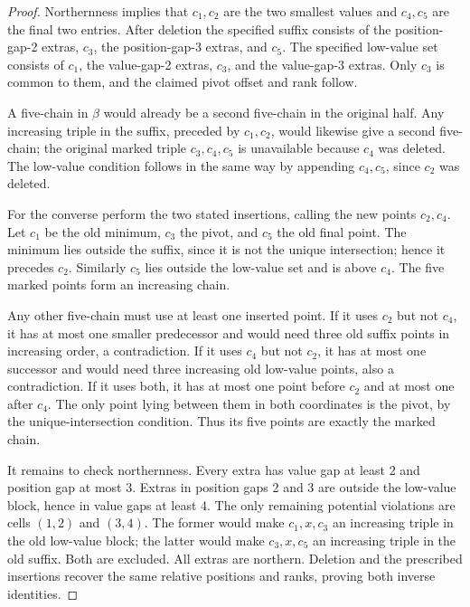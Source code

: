 \documentclass[11pt,letterpaper]{article}
\theoremstyle{remark}\newtheorem{remark}[theorem]{Remark}
\numberwithin{equation}{section}
\begin{document}
\begin{proof}
Northernness implies that $c_1,c_2$ are the two smallest values and
$c_4,c_5$ are the final two entries. After deletion the specified suffix
consists of the position-gap-2 extras, $c_3$, the position-gap-3 extras,
and $c_5$. The specified low-value set consists of $c_1$, the
value-gap-2 extras, $c_3$, and the value-gap-3 extras. Only $c_3$ is
common to them, and the claimed pivot offset and rank follow.

A five-chain in $\beta$ would already be a second five-chain in the
original half. Any increasing triple in the suffix, preceded by
$c_1,c_2$, would likewise give a second five-chain; the original marked
triple $c_3,c_4,c_5$ is unavailable because $c_4$ was deleted. The
low-value condition follows in the same way by appending $c_4,c_5$,
since $c_2$ was deleted.

For the converse perform the two stated insertions, calling the new
points $c_2,c_4$. Let $c_1$ be the old minimum, $c_3$ the pivot, and
$c_5$ the old final point. The minimum lies outside the suffix, since
it is not the unique intersection; hence it precedes $c_2$. Similarly
$c_5$ lies outside the low-value set and is above $c_4$. The five marked
points form an increasing chain.

Any other five-chain must use at least one inserted point. If it uses
$c_2$ but not $c_4$, it has at most one smaller predecessor and would
need three old suffix points in increasing order, a contradiction.
If it uses $c_4$ but not $c_2$, it has at most one successor and would
need three increasing old low-value points, also a contradiction.
If it uses both, it has at most one point before $c_2$ and at most one
after $c_4$. The only point lying between them in both coordinates is
the pivot, by the unique-intersection condition. Thus its five points
are exactly the marked chain.

It remains to check northernness. Every extra has value gap at least
2 and position gap at most 3. Extras in position gaps 2 and 3 are
outside the low-value block, hence in value gaps at least 4. The only
remaining potential violations are cells $(1,2)$ and $(3,4)$.
The former would make $c_1,x,c_3$ an increasing triple in the old
low-value block; the latter would make $c_3,x,c_5$ an increasing triple
in the old suffix. Both are excluded. All extras are northern.
Deletion and the prescribed insertions recover the same relative
positions and ranks, proving both inverse identities.
\end{proof}
\end{document}
